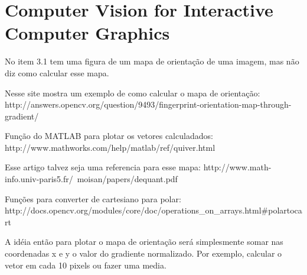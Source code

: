 \section{Computer Vision for Interactive Computer Graphics}

No item 3.1 tem uma figura de um mapa de orientação de uma imagem, mas não diz como calcular esse mapa.

Nesse site mostra um exemplo de como calcular o mapa de orientação:
http://answers.opencv.org/question/9493/fingerprint-orientation-map-through-gradient/

Função do MATLAB para plotar os vetores calculadados:
http://www.mathworks.com/help/matlab/ref/quiver.html

Esse artigo talvez seja uma referencia para esse mapa:
http://www.math-info.univ-paris5.fr/~moisan/papers/dequant.pdf

Funções para converter de cartesiano para polar:
http://docs.opencv.org/modules/core/doc/operations_on_arrays.html#polartocart

A idéia então para plotar o mapa de orientação será simplesmente somar nas coordenadas x e y o valor do gradiente normalizado.
Por exemplo, calcular o vetor em cada 10 pixels ou fazer uma media.